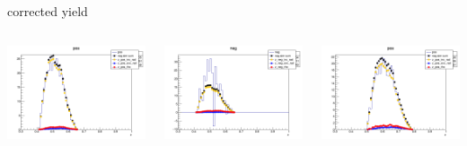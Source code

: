 \begin{frame}{corrected yield}
\begin{columns}
\begin{column}[T]{0.25\textwidth}
\includegraphics[width = \textwidth]{results/yield/statistics_corr/yield_x_Q2_z_0.40_4.000_0.50_pos.png}
\end{column}
\begin{column}[T]{0.25\textwidth}
\includegraphics[width = \textwidth]{results/yield/statistics_corr/yield_x_Q2_z_0.40_4.000_0.50_neg.png}
\end{column}
\begin{column}[T]{0.25\textwidth}
\includegraphics[width = \textwidth]{results/yield/statistics_corr/yield_x_Q2_z_0.40_4.000_0.60_pos.png}

\end{column}
\end{columns}
\end{frame}

